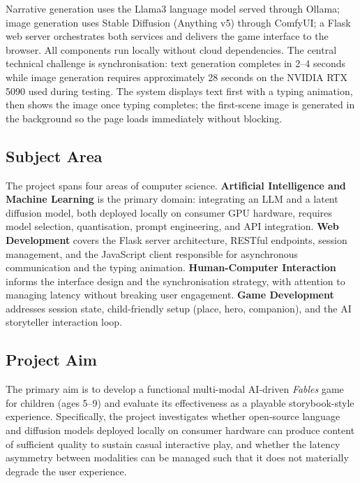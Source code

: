 \documentclass[12pt,a4paper]{article}
\begin{document}
Narrative generation uses the Llama3 language model served through Ollama; image generation uses Stable Diffusion (Anything v5) through ComfyUI; a Flask web server orchestrates both services and delivers the game interface to the browser. All components run locally without cloud dependencies. The central technical challenge is synchronisation: text generation completes in 2--4 seconds while image generation requires approximately 28 seconds on the NVIDIA RTX 5090 used during testing. The system displays text first with a typing animation, then shows the image once typing completes; the first-scene image is generated in the background so the page loads immediately without blocking.

    \subsection{Subject Area}

The project spans four areas of computer science. \textbf{Artificial Intelligence and Machine Learning} is the primary domain: integrating an LLM and a latent diffusion model, both deployed locally on consumer GPU hardware, requires model selection, quantisation, prompt engineering, and API integration. \textbf{Web Development} covers the Flask server architecture, RESTful endpoints, session management, and the JavaScript client responsible for asynchronous communication and the typing animation. \textbf{Human-Computer Interaction} informs the interface design and the synchronisation strategy, with attention to managing latency without breaking user engagement. \textbf{Game Development} addresses session state, child-friendly setup (place, hero, companion), and the AI storyteller interaction loop.

    \subsection{Project Aim}

The primary aim is to develop a functional multi-modal AI-driven \textit{Fables} game for children (ages 5--9) and evaluate its effectiveness as a playable storybook-style experience. Specifically, the project investigates whether open-source language and diffusion models deployed locally on consumer hardware can produce content of sufficient quality to sustain casual interactive play, and whether the latency asymmetry between modalities can be managed such that it does not materially degrade the user experience.
\end{document}
